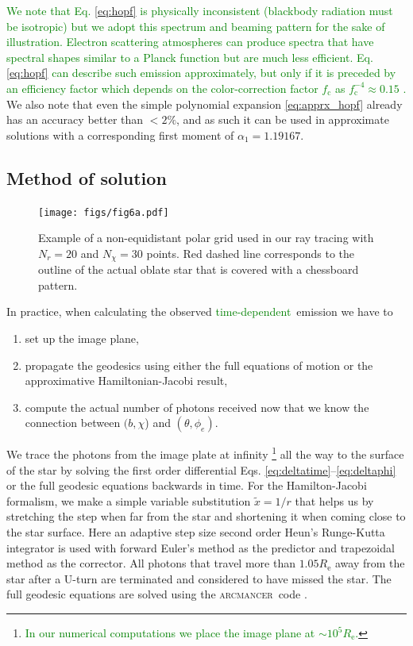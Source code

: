 \documentclass{aa}
\newcommand{\refe}[1]{\textcolor{green}{{#1}}}
\begin{document}
\refe{We note that Eq. \eqref{eq:hopf} is physically inconsistent (blackbody radiation must be isotropic) but we adopt this spectrum and beaming pattern for the sake of illustration. 
Electron scattering atmospheres can produce spectra that have spectral shapes similar to a Planck function but are much less efficient. 
Eq. \eqref{eq:hopf} can describe such emission approximately, but only if it is preceded by an efficiency factor which depends on the color-correction factor $f_{\mathrm{c}}$ as $f_{\mathrm{c}}^{-4} \approx 0.15$ \citep[see e.g.][]{SPW11, SPW12}.  }
We also note that even the simple polynomial expansion \eqref{eq:apprx_hopf} already has an accuracy better than $<2\%$, and as such it can be used in approximate solutions with a corresponding first moment of $\alpha_1 = 1.19167$.




\subsection{Method of solution}\label{sect:num_methods}


\begin{figure}
\centering
\texttt{[image: figs/fig6a.pdf]}
\caption{\label{fig:grid}
Example of a non-equidistant polar grid used in our ray tracing with $N_r = 20$ and $N_{\chi} = 30$ points.
    Red dashed line corresponds to the outline of the actual oblate star that is covered with a chessboard pattern.
}
\end{figure}

In practice, when calculating the observed \refe{time-dependent} emission we have to 
\begin{enumerate}
    \item set up the image plane, 
    \item propagate the geodesics using either the full equations of motion or the approximative Hamiltonian-Jacobi result, 
    \item compute the actual number of photons received now that we know the connection between $(b,\chi$) and $(\theta, \phi_e)$.
\end{enumerate}

We trace the photons from the image plate at infinity%
\footnote{\refe{ In our numerical computations we place the image plane at $\sim 10^5 R_{\mathrm{e}}$.}}
all the way to the surface of the star by solving the first order
differential Eqs. \eqref{eq:deltatime}--\eqref{eq:deltaphi} or the full geodesic equations backwards in time.  
For the Hamilton-Jacobi formalism, we make a simple variable substitution $\tilde{x} = 1/r$
 that helps us by stretching the step when
far from the star and shortening it when coming close to the star
surface.  Here an adaptive step size second order Heun's Runge-Kutta
integrator is used with forward Euler's method as
the predictor and trapezoidal method as the corrector.  
All photons that travel more than $1.05 R_{\mathrm{e}}$ away from the star after a U-turn are
terminated and considered to have missed the star.
The full geodesic equations are solved using the \textsc{arcmancer} code \citep[see][and the related equations therein]{PRJ16}.
\end{document}
